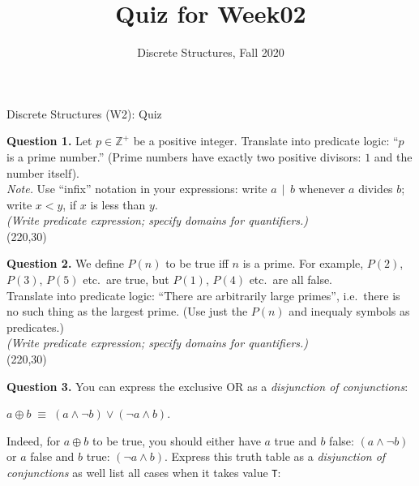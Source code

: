 \documentclass[jou]{apa6}
\title{Quiz for Week02}
\author{Discrete Structures, Fall 2020}
\affiliation{RBS}
\begin{document}

\twocolumn
{\Large Discrete Structures (W2): Quiz}

\thispagestyle{empty}

\vspace{6pt}
{\bf Question 1.} Let $p \in \mathbb{Z}^{+}$ be a positive integer.
Translate into predicate logic: ``$p$ is a prime number.'' (Prime numbers
have exactly two positive divisors: $1$ and the number itself).\\
{\em Note.} Use ``infix'' notation in your expressions: write 
$a\,\mid\,b$ whenever $a$ divides $b$; write $x < y$, if $x$ is less than $y$.\\
{\scriptsize \em (Write predicate expression; specify domains for quantifiers.)}\\
\framebox(220,30){}


{\bf Question 2.} We define $P(n)$ to be true
iff $n$ is a prime. For example, 
$P(2)$, $P(3)$, $P(5)$ etc.\ are true,
but $P(1)$, $P(4)$ etc.\ are all false.\\
Translate into predicate logic: ``There are arbitrarily large primes'', i.e.\ there is no 
such thing as the largest prime.
(Use just the $P(n)$ and inequaly symbols as predicates.)\\
{\scriptsize \em (Write predicate expression; specify domains for quantifiers.)}\\
\framebox(220,30){}


{\bf Question 3.} You can express the exclusive OR as a {\em disjunction of conjunctions}:
\begin{center}
$a \oplus b \;\equiv\; (a \wedge \neg b) \vee (\neg a \wedge b)$.
\end{center}
Indeed, for $a \oplus b$ to be true, you should 
either have $a$ true and $b$ false: $(a \wedge \neg b)$ or 
$a$ false and $b$ true: $(\neg a \wedge b)$. 
Express this truth table as a {\em disjunction of conjunctions} as well \textendash{}
list all cases when it takes value {\tt T}:
\end{document}
